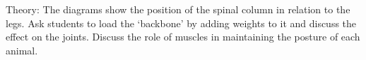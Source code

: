 \begin{multicols}{2}
\begin{description*}
\item[Theory:]{The diagrams show the position of the spinal column in relation
to the legs. Ask students to load the
`backbone' by adding weights
to it and discuss the effect on
the joints.
Discuss the role of muscles in
maintaining the posture of
each animal.}
\end{description*}



\end{multicols}

\pagebreak
